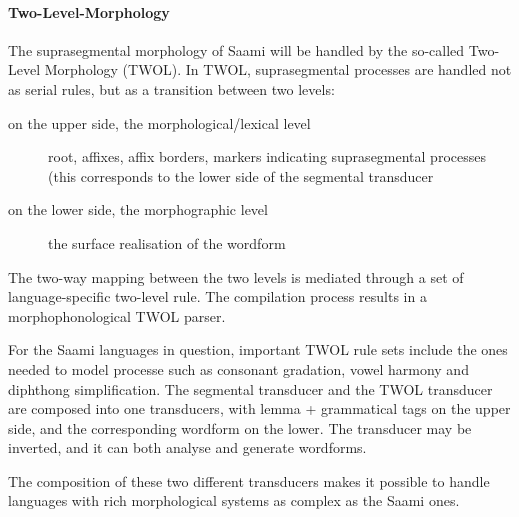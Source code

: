 \documentclass[a4paper,12pt]{article}
\begin{document}
\paragraph{Two-Level-Morphology}

The suprasegmental morphology of Saami will be handled by the so-called Two-Level Morphology (TWOL). In TWOL, suprasegmental processes are handled not as serial rules, but as a transition between two levels:
\begin{description}
\item[on the upper side, the morphological/lexical level] root, affixes, affix borders, markers indicating suprasegmental processes (this corresponds to the lower side of the segmental transducer
\item[on the lower side, the morphographic level] the surface realisation of the wordform
\end{description}

The two-way mapping between the two levels is mediated through a set of language-specific two-level rule. The compilation process results in a morphophonological TWOL parser.

For the Saami languages in question, important TWOL rule sets include the ones needed to model processe such as consonant gradation, vowel harmony and diphthong simplification. The segmental transducer and the TWOL transducer are composed into one transducers, with lemma + grammatical tags on the upper side, and the corresponding wordform on the lower. The transducer may be inverted, and it can both analyse and generate wordforms.

The composition of these two different transducers makes it possible to handle languages with rich morphological systems as complex as the Saami ones. 


\end{document}
